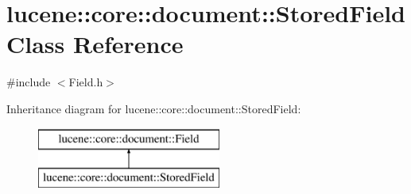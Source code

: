 \hypertarget{classlucene_1_1core_1_1document_1_1StoredField}{}\section{lucene\+:\+:core\+:\+:document\+:\+:Stored\+Field Class Reference}
\label{classlucene_1_1core_1_1document_1_1StoredField}


{\ttfamily \#include $<$Field.\+h$>$}

Inheritance diagram for lucene\+:\+:core\+:\+:document\+:\+:Stored\+Field\+:\begin{figure}[H]
\begin{center}
\leavevmode
\includegraphics[height=2.000000cm]{classlucene_1_1core_1_1document_1_1StoredField}
\end{center}
\end{figure}
